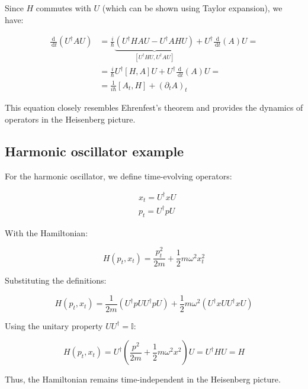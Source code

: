 \documentclass[italian]{HKNdocument}
\begin{document}
Since $H$ commutes with $U$ (which can be shown using Taylor expansion), we have:

\begin{align}
\frac{\mathrm{d}}{\mathrm{~d} t}\left(U^{\dagger} A U\right) & =\frac{i}{\hbar} \underbrace{\left(U^{\dagger} H A U-U^{\dagger} A H U\right)}_{\left[U^{\dagger}HU, U^{\dagger}AU\right]}+U^{\dagger} \frac{\mathrm{~d}}{\mathrm{~d} t}(A) U= \\
& =\frac{i}{\hbar} U^{\dagger}[H,A]U + U^{\dagger} \frac{\mathrm{d}}{\mathrm{~d} t}(A) U= \\
& =\frac{1}{i \hbar}\left[A_{t}, H\right]+\left(\partial_{t} A\right)_{t} \label{eq:10.42}
\end{align}

This equation closely resembles Ehrenfest's theorem and provides the dynamics of operators in the Heisenberg picture.

\subsection{Harmonic oscillator example}
For the harmonic oscillator, we define time-evolving operators:

\begin{align}
& x_{t}=U^{\dagger} x U \\
& p_{t}=U^{\dagger} p U \label{eq:10.43}
\end{align}

With the Hamiltonian:

\begin{equation}
H\left(p_{t}, x_{t}\right)=\frac{p_{t}^{2}}{2 m}+\frac{1}{2} m \omega^{2} x_{t}^{2} \label{eq:10.44}
\end{equation}

Substituting the definitions:

\begin{equation}
H\left(p_{t}, x_{t}\right)=\frac{1}{2 m}\left(U^{\dagger} p U U^{\dagger} p U\right) + \frac{1}{2} m \omega^{2}\left(U^{\dagger} x U U^{\dagger} x U\right) \label{eq:10.45}
\end{equation}

Using the unitary property $U U^{\dagger}=\mathbb{I}$:

\begin{equation}
H\left(p_{t}, x_{t}\right)=U^{\dagger}\left(\frac{p^{2}}{2 m}+\frac{1}{2} m \omega^{2} x^{2}\right) U=U^{\dagger} H U=H \label{eq:10.46}
\end{equation}

Thus, the Hamiltonian remains time-independent in the Heisenberg picture.
\end{document}
